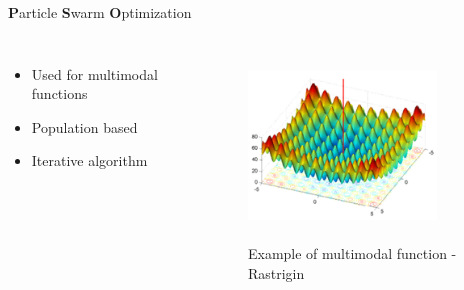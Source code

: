 \documentclass{beamer}
\begin{document}
	\begin{frame}{\textbf{P}article \textbf{S}warm \textbf{O}ptimization}
		\begin{columns}
				\begin{itemize}
					\item Used for multimodal functions
					\item Population based
					\item Iterative algorithm	
				\end{itemize}
				\begin{figure}[htp]
					\centering
					\includegraphics[width=5cm,height=5cm]{images/dpso_rastrigin.png}
					\caption{Example of multimodal function - Rastrigin}
				\end{figure}
		\end{columns}
	\end{frame}
	
\end{document}
